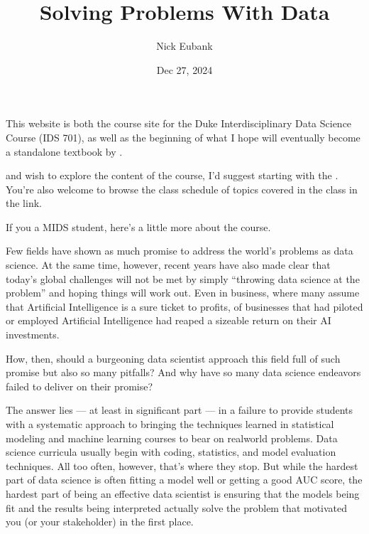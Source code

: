 \documentclass[letterpaper,10pt,english]{jupyterBook}
\title{Solving Problems With Data}
\date{Dec 27, 2024}
\author{Nick Eubank}
\begin{document}
\pagestyle{empty}
\sphinxmaketitle
\pagestyle{plain}
\sphinxtableofcontents
\pagestyle{normal}
\label{\detokenize{landing_page::doc}}


\sphinxAtStartPar
This website is both the course site for the Duke Interdisciplinary Data Science Course  (IDS 701), as well as the beginning of what I hope will eventually become a stand\sphinxhyphen{}alone textbook by .

\sphinxAtStartPar
{} and wish to explore the content of the course, I’d suggest starting with the {\hyperref[\detokenize{10_introduction/10_solving_problems_with_data::doc}]{}}. You’re also welcome to browse the class schedule of topics covered in the class in the {\hyperref[\detokenize{00_class_schedule/class_schedule::doc}]{}} link.

\sphinxAtStartPar
If you  a MIDS student, here’s a little more about the course.

\begin{DUlineblock}{0em}
\item[] 
\end{DUlineblock}

\sphinxAtStartPar
Few fields have shown as much promise to address the world’s problems as data science. At the same time, however, recent years have also made clear that today’s global challenges will not be met by simply “throwing data science at the problem” and hoping things will work out. Even in business, where many assume that Artificial Intelligence is a sure ticket to profits,  of businesses that had piloted or employed Artificial Intelligence had reaped a sizeable return on their AI investments.

\sphinxAtStartPar
How, then, should a burgeoning data scientist approach this field full of such promise but also so many pitfalls? And why have so many data science endeavors failed to deliver on their promise?

\sphinxAtStartPar
The answer lies — at least in significant part — in a failure to provide students with a systematic approach to bringing the techniques learned in statistical modeling and machine learning courses to bear on real\sphinxhyphen{}world problems. Data science curricula usually begin with coding, statistics, and model evaluation techniques. All too often, however, that’s where they stop. But while the hardest part of data science  is often fitting a model well or getting a good AUC score, the hardest part of being an effective  data scientist is ensuring that the models being fit and the results being interpreted actually solve the problem that motivated you (or your stakeholder) in the first place.
\end{document}
